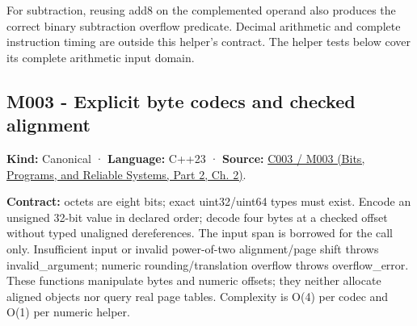 For subtraction, reusing add8 on the complemented operand also produces the correct binary subtraction overflow predicate. Decimal arithmetic and complete instruction timing are outside this helper's contract. The helper tests below cover its complete arithmetic input domain.

\subsection{M003 - Explicit byte codecs and checked alignment}\label{appendix-4e2236f53445-m003---explicit-byte-codecs-and-checked-alignment}

\hypertarget{appendix-4e2236f53445-m003---explicit-byte-codecs-and-checked-alignment}{}

\textbf{Kind:} Canonical · \textbf{Language:} C++23 · \textbf{Source:} \href{../01-Bits-Programs-and-Reliable-Systems-P02/main.pdf\#nameddest=01-foundations-i-ch002-where-the-bytes-live}{C003 / M003 (Bits, Programs, and Reliable Systems, Part 2, Ch. 2)}.

\textbf{Contract:} octets are eight bits; exact uint32/uint64 types must exist. Encode an unsigned 32-bit value in declared order; decode four bytes at a checked offset without typed unaligned dereferences. The input span is borrowed for the call only. Insufficient input or invalid power-of-two alignment/page shift throws invalid\_argument; numeric rounding/translation overflow throws overflow\_error. These functions manipulate bytes and numeric offsets; they neither allocate aligned objects nor query real page tables. Complexity is O(4) per codec and O(1) per numeric helper.

